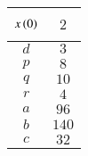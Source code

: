 \begin{tabular}{|p{4.5cm}|p{4.5cm}|}
    \hline
      $$x\left(0\right)$$ & $$2$$  \\ \hline
      $$d$$ & $$3$$  \\ \hline
      $$p$$ & $$8$$  \\ \hline
      $$q$$ & $$10$$  \\ \hline
      $$r$$ & $$4$$  \\ \hline
      $$a$$ & $$96$$  \\ \hline
      $$b$$ & $$140$$  \\ \hline
      $$c$$ & $$32$$  \\ \hline
\end{tabular}